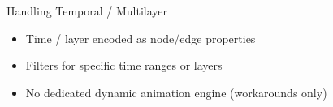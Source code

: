 \begin{frame}{Handling Temporal / Multilayer}
	\begin{itemize}
		\item Time / layer encoded as node/edge properties
		\item Filters for specific time ranges or layers
		\item No dedicated dynamic animation engine (workarounds only)
	\end{itemize}
\end{frame}